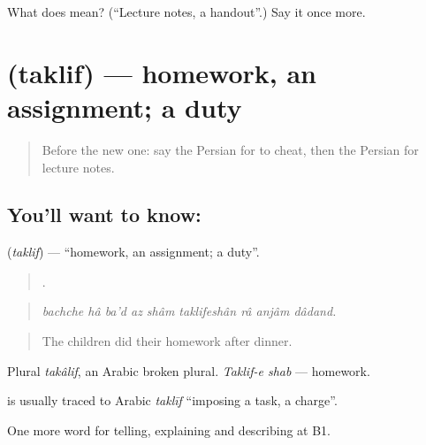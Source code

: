 \begin{tcolorbox}[breakable,colback=teal!4,colframe=teal!35!black,title={Before you move on}]
What does  mean? (\textquotedblleft{}Lecture notes, a handout\textquotedblright{}.) Say it once more.
\end{tcolorbox}
\section[\texorpdfstring{\fa{تکلیف} (taklif)}{تکلیف (taklif)}]{ (taklif) — homework, an assignment; a duty}

\label{lesson:FA-C401-taklif}



\begin{quote}
Before the new one: say the Persian for to cheat, then the Persian for lecture notes.
\end{quote}

\subsection*{You'll want to know: }
\textbf{} (\emph{taklif}) — \textquotedblleft{}homework, an assignment; a duty\textquotedblright{}.

\begin{quote}
        .
\end{quote}

\begin{quote}
\emph{bachche hâ ba'd az shâm taklifeshân râ anjâm dâdand.}
\end{quote}

\begin{quote}
The children did their homework after dinner.
\end{quote}

Plural \emph{takâlif}, an Arabic broken plural. \emph{Taklif-e shab} — homework.

\begin{cousinweb}
\textbf{} is usually traced to Arabic \emph{taklīf} \textquotedblleft{}imposing a task, a charge\textquotedblright{}.
\end{cousinweb}

\begin{grammarlens}[title={What you've built}]
One more word for telling, explaining and describing at B1.
\end{grammarlens}

